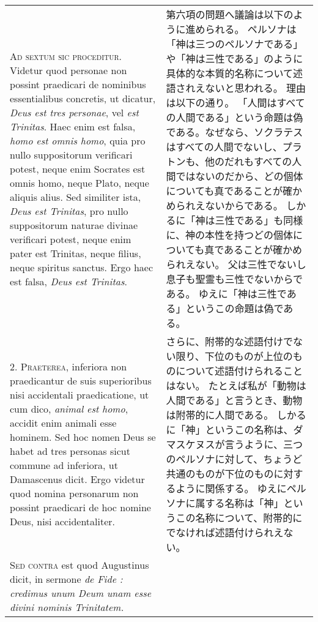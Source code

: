 \documentclass[10pt]{jsarticle} %
\begin{document}
\begin{longtable}{p{21em}p{21em}}

\textsc{Ad sextum sic proceditur}. Videtur quod personae non possint praedicari de
nominibus essentialibus concretis, ut dicatur, \textit{Deus est tres personae}, vel \textit{est
Trinitas}. Haec enim est falsa, \textit{homo est omnis homo}, quia pro nullo suppositorum
verificari potest, neque enim Socrates est omnis homo, neque Plato, neque
aliquis alius. Sed similiter ista, \textit{Deus est Trinitas}, pro nullo suppositorum
naturae divinae verificari potest, neque enim pater est Trinitas, neque filius,
neque spiritus sanctus. Ergo haec est falsa, \textit{Deus est Trinitas}.


&

第六項の問題へ議論は以下のように進められる。
ペルソナは「神は三つのペルソナである」や「神は三性である」のように具体的な本質的名称について述語されえないと思われる。
理由は以下の通り。
「人間はすべての人間である」という命題は偽である。なぜなら、ソクラテスはすべての人間でないし、プラトンも、他のだれもすべての人間ではないのだから、どの個体についても真であることが確かめられえないからである。
しかるに「神は三性である」も同様に、神の本性を持つどの個体についても真であることが確かめられえない。
父は三性でないし息子も聖霊も三性でないからである。
ゆえに「神は三性である」というこの命題は偽である。


\\

2. \textsc{Praeterea}, inferiora non praedicantur de suis superioribus nisi accidentali
praedicatione, ut cum dico, \textit{animal est homo}, accidit enim animali esse hominem.
Sed hoc nomen Deus se habet ad tres personas sicut commune ad inferiora, ut
Damascenus dicit. Ergo videtur quod nomina personarum non possint praedicari de
hoc nomine Deus, nisi accidentaliter.


&

さらに、附帯的な述語付けでない限り、下位のものが上位のものについて述語付けられることはない。
たとえば私が「動物は人間である」と言うとき、動物は附帯的に人間である。
しかるに「神」というこの名称は、ダマスケヌスが言うように、三つのペルソナに対して、ちょうど共通のものが下位のものに対するように関係する。
ゆえにペルソナに属する名称は「神」というこの名称について、附帯的にでなければ述語付けられえない。

\\

\textsc{Sed contra} est quod Augustinus dicit, in sermone \textit{de Fide : credimus unum Deum
unam esse divini nominis Trinitatem.}



\end{longtable}
\end{document}
